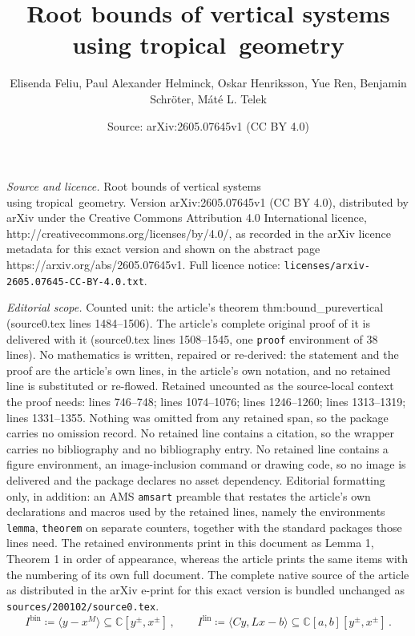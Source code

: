 \documentclass[10pt,a4paper]{amsart}
\title{Root bounds of vertical systems\\ using tropical~geometry}
\author{Elisenda Feliu, Paul Alexander Helminck, Oskar Henriksson, Yue Ren, Benjamin Schr\"oter, M\'at\'e L. Telek}
\date{Source: arXiv:2605.07645v1 (CC BY 4.0)}
\newcommand{\CC}{\mathbb{C}}
\newcommand{\bin}{{\mathrm{bin}}}
\newcommand{\lin}{{\mathrm{lin}}}
\begin{document}
\maketitle

\noindent\emph{Source and licence.} Root bounds of vertical systems\\ using tropical~geometry. Version arXiv:2605.07645v1 (CC BY 4.0), distributed by arXiv under the Creative Commons Attribution 4.0 International licence, http://creativecommons.org/licenses/by/4.0/, as recorded in the arXiv licence metadata for this exact version and shown on the abstract page https://arxiv.org/abs/2605.07645v1. Full licence notice: \texttt{licenses/arxiv-2605.07645-CC-BY-4.0.txt}.\par\smallskip

\noindent\textit{Editorial scope.} Counted unit: the article's theorem thm:bound\_purevertical (source0.tex lines 1484--1506). The article's complete original proof of it is delivered with it (source0.tex lines 1508--1545, one \texttt{proof} environment of 38 lines). No mathematics is written, repaired or re-derived: the statement and the proof are the article's own lines, in the article's own notation, and no retained line is substituted or re-flowed.  Retained uncounted as the source-local context the proof needs: lines 746--748; lines 1074--1076; lines 1246--1260; lines 1313--1319; lines 1331--1355.  Nothing was omitted from any retained span, so the package carries no omission record.  No retained line contains a citation, so the wrapper carries no bibliography and no bibliography entry.  No retained line contains a figure environment, an image-inclusion command or drawing code, so no image is delivered and the package declares no asset dependency.  Editorial formatting only, in addition: an AMS \texttt{amsart} preamble that restates the article's own declarations and macros used by the retained lines, namely the environments \texttt{lemma}, \texttt{theorem} on separate counters, together with the standard packages those lines need.  The retained environments print in this document as Lemma 1, Theorem 1 in order of appearance, whereas the article prints the same items with the numbering of its own full document.  The complete native source of the article as distributed in the arXiv e-print for this exact version is bundled unchanged as \texttt{sources/200102/source0.tex}.
\begin{equation} \label{eq:monomial_linbin}
I^{\bin}\coloneqq \langle y - x^{M}  \rangle \subseteq \CC[y^\pm,x^\pm]\,, \qquad  I^{\lin} \coloneqq \langle C y  , Lx - b  \rangle \subseteq \CC[a,b][y^\pm,x^\pm]  \,.
\end{equation}
\end{document}
